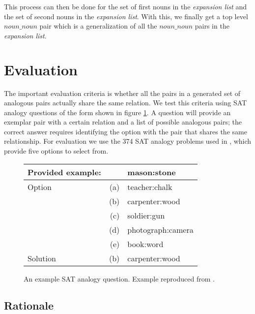\documentclass[11pt]{article}
\begin{document}
This process can then be done for the set of first nouns in the \emph{expansion
list} and the set of second nouns in the \emph{expansion list}.  With this, we
finally get a top level $noun\_noun$ pair which is a generalization of all the
$noun\_noun$ pairs in the \emph{expansion list}.

\section{Evaluation}
\label{sec:evaluation}

The important evaluation criteria is whether all the pairs in a generated set of
analogous pairs actually share the same relation.  We test this criteria using
SAT analogy questions of the form shown in figure \ref{fig:sat-question}.  A
question will provide an exemplar pair with a certain relation and a list of
possible analogous pairs; the correct answer requires identifying the option
with the pair that shares the same relationship.  For evaluation we use the 374
SAT analogy problems used in \cite{turney03combining}, which provide five
options to select from.  

\begin{figure}
  \begin{tabular}{lrl}
    \hline
    Provided example: & & mason:stone \\
    \hline
    Option & (a) & teacher:chalk \\
    & (b) & carpenter:wood  \\
    & (c) & soldier:gun \\
    & (d) & photograph:camera \\
    & (e) & book:word \\
    Solution & (b) & carpenter:wood  \\
    \hline
  \end{tabular}
  \caption{An example SAT analogy question.  Example reproduced from
    \cite{turney03combining}.}
  \label{fig:sat-question}
\end{figure}

\subsection{Rationale}
\end{document}
